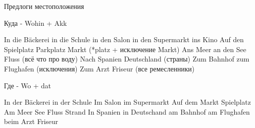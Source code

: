 \documentclass[12pt]{report}
\begin{document}
Предлоги местоположения

Куда - Wohin + Akk

In die Bäckerei in die Schule in den Salon in den Supermarkt ins Kino 
Auf den Spielplatz Parkplatz Markt (*platz + исключение Markt)
Ans Meer an den See Fluss (всё что про воду)
Nach Spanien Deutschland (страны)
Zum Bahnhof zum Flughafen (исключения)
Zum Arzt Friseur (все ремесленники)

Где - Wo + dat

In der Bäckerei in der Schule Im Salon im Supermarkt 
Auf dem Markt  Spielplatz
Am Meer See Fluss Strand
In Spanien in Deutschand
am Bahnhof am Flughafen
beim  Arzt Friseur
\end{document}
